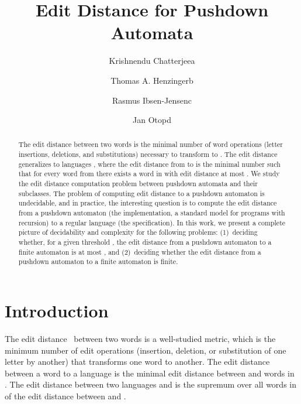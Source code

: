 \documentclass{CSML}
\title[Edit Distance for Pushdown Automata]{Edit Distance for Pushdown Automata}
\author[K.~Chatterjee]{Krishnendu Chatterjee\rsuper a}
\author[T.~A.~Henzinger]{Thomas A. Henzinger\rsuper b}
\author[R.~Ibsen{-}Jensen]{Rasmus Ibsen{-}Jensen\rsuper c}
\author[J.~Otop]{Jan Otop\rsuper d}
\begin{document}
\maketitle

\makeatletter{}\begin{abstract}
The edit distance between two words  is the minimal number of word 
operations (letter insertions, deletions, and substitutions) 
necessary to transform  to .
The edit distance generalizes to languages , where 
the edit distance from  to  is the minimal number  such that for every word 
from  there exists a word in  with edit distance at most .
We study the edit distance computation problem between pushdown automata 
and their subclasses.
The problem of computing edit distance to a pushdown automaton is undecidable,
and in practice, the interesting question is to compute the edit distance 
from a pushdown automaton (the implementation, a standard model for programs with 
recursion) to a regular language (the specification).
In this work, we present a complete picture of decidability and complexity
for the following problems: (1)~deciding whether, for a given threshold , the edit distance from a pushdown automaton to a finite
automaton is at most , and
(2)~deciding whether the edit distance from a pushdown automaton to a finite automaton is finite.
\end{abstract}
 

\section{Introduction}
\makeatletter{}
The edit distance~\cite{levenshtein1966binary} between two words is a well-studied 
metric, which is the minimum number of edit operations (insertion, deletion, 
or substitution of one letter by another) that transforms one word to 
another. 
The edit distance between a word  to a language  is the minimal 
edit distance between  and words in . 
The edit distance between two languages  and  is the supremum over 
all words  in  of the edit distance between  and .
\end{document}
